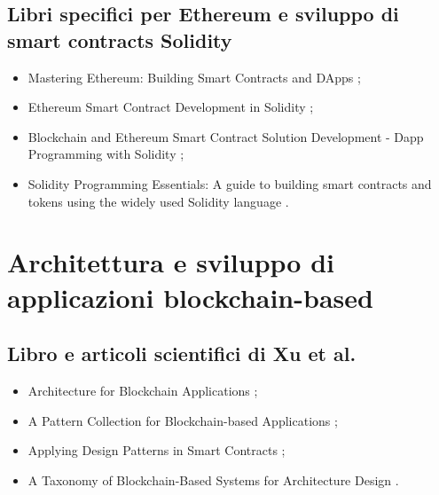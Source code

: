 \subsection*{Libri specifici per Ethereum e sviluppo di smart contracts Solidity}
\begin{itemize}

\item Mastering Ethereum: Building Smart Contracts and DApps \cite{antonopoulos2018ethereum};

\item Ethereum Smart Contract Development in Solidity \cite{zheng2020solidity};

\item Blockchain and Ethereum Smart Contract Solution Development - Dapp Programming with Solidity \cite{zhang2022solidity};

\item Solidity Programming Essentials: A guide to building smart contracts and tokens using the widely used Solidity language \cite{modi2022solidity}.

\end{itemize}

\section*{Architettura e sviluppo di applicazioni blockchain-based}

\subsection*{Libro e articoli scientifici di Xu et al.}
\begin{itemize}

\item Architecture for Blockchain Applications \cite{xu2019book};

\item A Pattern Collection for Blockchain-based Applications \cite{xu2018patterns};

\item Applying Design Patterns in Smart Contracts \cite{xu2018design};

\item A Taxonomy of Blockchain-Based Systems for Architecture Design \cite{xu2017architecture}.

\end{itemize}

